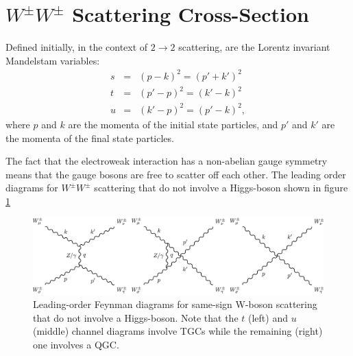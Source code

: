 \section{$W^{\pm}W^{\pm}$ Scattering Cross-Section}
\label{ssWW x-section}
Defined initially, in the context of $2\longrightarrow 2$ scattering, are the Lorentz invariant Mandelstam variables:
\begin{eqnarray}
s &=& \left( p - k \right)^{2} = \left( p' + k' \right)^{2} \nonumber \\
t &=& \left(p' - p \right)^{2} = \left(k' - k \right)^{2} \nonumber \\
u &=& \left(k' - p \right)^{2} = \left( p' - k \right)^{2},
\end{eqnarray}
where $p$ and $k$ are the momenta of the initial state particles, and $p'$ and $k'$ are the momenta of the final state particles.

The fact that the electroweak interaction has a non-abelian gauge symmetry means that the gauge bosons are free to scatter off each other. The leading order diagrams for $W^{\pm}W^{\pm}$ scattering that do not involve a Higgs-boson shown in figure \ref{diagrams no higgs}
\begin{figure}
\centering
\includegraphics[width=1.0\textwidth]{images/ssWW/diagrams_no_higgs.png}
\caption{Leading-order Feynman diagrams for same-sign W-boson scattering that do not involve a Higgs-boson. Note that the $t$ (left) and $u$ (middle) channel diagrams involve TGCs while the remaining (right) one involves a QGC.}
\label{diagrams no higgs}
\end{figure}


